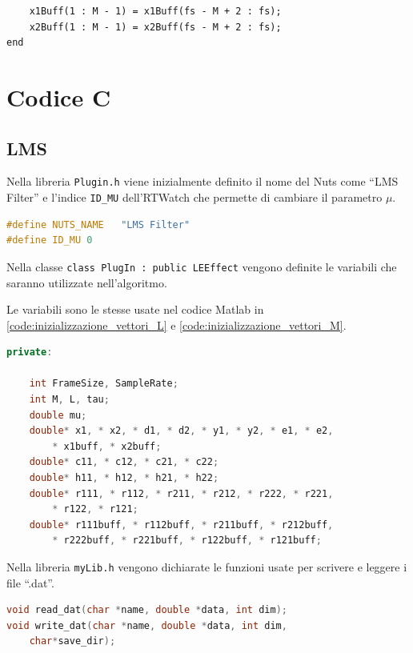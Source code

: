 \documentclass[12pt,a4paper,titlepage]{article}
\begin{document}
\begin{lstlisting}[label=code:ols6, caption=Aggiornamento del buffer di ingresso, captionpos=b, language=matlabfloz]
    % first M - 1 values of the new vector must be the last ones of the previous array
    x1Buff(1 : M - 1) = x1Buff(fs - M + 2 : fs); 
    x2Buff(1 : M - 1) = x2Buff(fs - M + 2 : fs); 
end
\end{lstlisting}  

\clearpage

\section{Codice C}
\label{sec:codice_c}
\subsection{LMS}
\label{subsec:codice_c_lms}
Nella libreria \texttt{Plugin.h} viene inizialmente definito il nome del Nuts come ``LMS Filter'' e l’indice \texttt{ID\_MU} dell'RTWatch che permette di cambiare
il parametro $\mu$.

\begin{lstlisting}[language=cpp, label = dichiarazione_costanti_lms, caption = Dichiarazione delle costanti in \texttt{Plugin.h}, captionpos = b]
#define NUTS_NAME	"LMS Filter"
#define ID_MU 0 
\end{lstlisting}
Nella classe \texttt{class PlugIn :	public LEEffect} vengono definite le variabili che saranno utilizzate nell'algoritmo.

Le variabili sono le stesse usate nel codice Matlab in \ref{code:inizializzazione_vettori_L} e \ref{code:inizializzazione_vettori_M}.
\begin{lstlisting}[language=cpp, label=code:variabili_lms, caption = Dichiarazione delle variabili in \texttt{Plugin.h}, breaklines = false, captionpos = b]
private:

	int FrameSize, SampleRate;
	int M, L, tau;
	double mu;
	double* x1, * x2, * d1, * d2, * y1, * y2, * e1, * e2,
		* x1buff, * x2buff;
	double* c11, * c12, * c21, * c22;
	double* h11, * h12, * h21, * h22;
	double* r111, * r112, * r211, * r212, * r222, * r221, 
		* r122, * r121;
	double* r111buff, * r112buff, * r211buff, * r212buff, 
		* r222buff, * r221buff, * r122buff, * r121buff;
\end{lstlisting}
Nella libreria \texttt{myLib.h} vengono dichiarate le funzioni usate per scrivere e leggere i file ``.dat''.

\begin{lstlisting}[language=cpp, label=code:myLib.h, caption = Libreria \texttt{myLib.h}, breaklines = false, captionpos = b]
void read_dat(char *name, double *data, int dim);
void write_dat(char *name, double *data, int dim, 
	char*save_dir);
\end{lstlisting}
\end{document}
